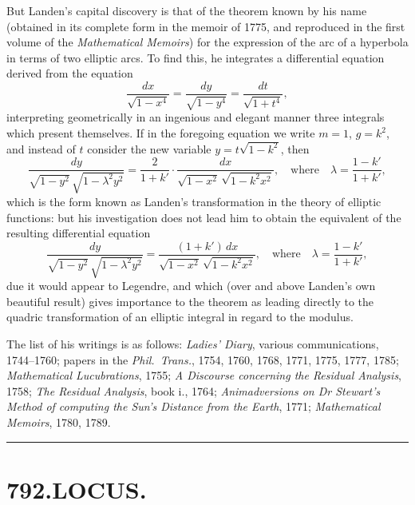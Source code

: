 \documentclass[11pt,a4paper]{book}
\begin{document}
But Landen's capital discovery is that of the theorem known by his name (obtained in its complete form in the memoir of 1775, and reproduced in the first volume of the \textit{Mathematical Memoirs}) for the expression of the arc of a hyperbola in terms of two elliptic arcs. To find this, he integrates a differential equation derived from the equation
\[
\frac{dx}{\sqrt{1 - x^{4}}} = \frac{dy}{\sqrt{1 - y^{4}}} = \frac{dt}{\sqrt{1 + t^{4}}},
\]
interpreting geometrically in an ingenious and elegant manner three integrals which present themselves. If in the foregoing equation we write $m = 1$, $g = k^{2}$, and instead of $t$ consider the new variable $y = t\sqrt{1 - k^{2}}$, then
\[
\frac{dy}{\sqrt{1 - y^{2}}\,\sqrt{1 - \lambda^{2}y^{2}}} = \frac{2}{1 + k'} \cdot \frac{dx}{\sqrt{1 - x^{2}}\,\sqrt{1 - k^{2}x^{2}}},
\quad \text{where}\quad \lambda = \frac{1 - k'}{1 + k'},
\]
which is the form known as Landen's transformation in the theory of elliptic functions: but his investigation does not lead him to obtain the equivalent of the resulting differential equation
\[
\frac{dy}{\sqrt{1 - y^{2}}\,\sqrt{1 - \lambda^{2}y^{2}}} = \frac{(1 + k')\, dx}{\sqrt{1 - x^{2}}\,\sqrt{1 - k^{2}x^{2}}},
\quad \text{where}\quad \lambda = \frac{1 - k'}{1 + k'},
\]
due it would appear to Legendre, and which (over and above Landen's own beautiful result) gives importance to the theorem as leading directly to the quadric transformation of an elliptic integral in regard to the modulus.

The list of his writings is as follows: \textit{Ladies' Diary}, various communications, 1744--1760; papers in the \textit{Phil.\ Trans.}, 1754, 1760, 1768, 1771, 1775, 1777, 1785; \textit{Mathematical Lucubrations}, 1755; \textit{A Discourse concerning the Residual Analysis}, 1758; \textit{The Residual Analysis}, book i., 1764; \textit{Animadversions on Dr Stewart's Method of computing the Sun's Distance from the Earth}, 1771; \textit{Mathematical Memoirs}, 1780, 1789.

\vspace{1em}
\hrule
\vspace{1em}



\section*{792.\quad LOCUS.}
\end{document}
